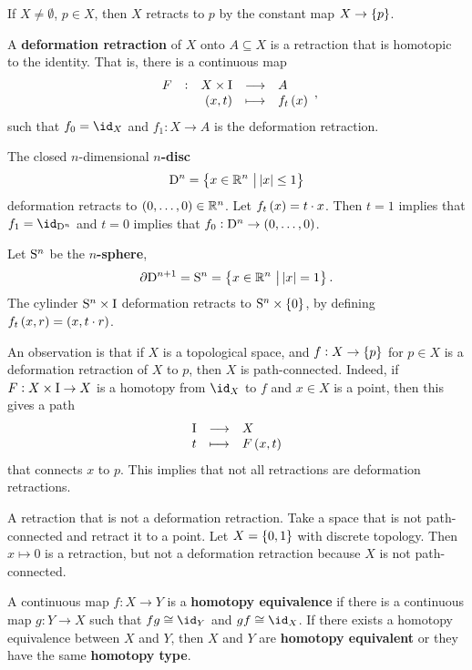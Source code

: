 \begin{example*}
If $ X \ne \emptyset $, $ p \in X $, then $ X $ retracts to $ p $ by the constant map $ X \to \cbr{p} $.
\end{example*}

\begin{definition*}
A \textbf{deformation retraction} of $ X $ onto $ A \subseteq X $ is a retraction that is homotopic to the identity. That is, there is a continuous map
$$ \function[F]{X \times \I}{A}{\br{x, t}}{f_t\br{x}}, $$
such that $ f_0 = \id_X $ and $ f_1 : X \to A $ is the deformation retraction.
\end{definition*}

\begin{example*}
The closed $ n $-dimensional \textbf{$ n $-disc}
$$ \D^n = \cbr{x \in \RR^n \st \abs{x} \le 1} $$
deformation retracts to $ \br{0, \dots, 0} \in \RR^n $. Let $ f_t\br{x} = t \cdot x $. Then $ t = 1 $ implies that $ f_1 = \id_{\D^n} $ and $ t = 0 $ implies that $ f_0 : \D^n \to \br{0, \dots, 0} $.
\end{example*}

\pagebreak

\begin{example*}
Let $ \S^n $ be the \textbf{$ n $-sphere},
$$ \da \D^{n + 1} = \S^n = \cbr{x \in \RR^n \st \abs{x} = 1}. $$
The cylinder $ \S^n \times \I $ deformation retracts to $ \S^n \times \cbr{0} $, by defining $ f_t\br{x, r} = \br{x, t \cdot r} $.
\end{example*}

An observation is that if $ X $ is a topological space, and $ f : X \to \cbr{p} $ for $ p \in X $ is a deformation retraction of $ X $ to $ p $, then $ X $ is path-connected. Indeed, if $ F : X \times \I \to X $ is a homotopy from $ \id_X $ to $ f $ and $ x \in X $ is a point, then this gives a path
$$ \function{\I}{X}{t}{F\br{x, t}} $$
that connects $ x $ to $ p $. This implies that not all retractions are deformation retractions.

\begin{example*}
A retraction that is not a deformation retraction. Take a space that is not path-connected and retract it to a point. Let $ X = \cbr{0, 1} $ with discrete topology. Then $ x \mapsto 0 $ is a retraction, but not a deformation retraction because $ X $ is not path-connected.
\end{example*}

\begin{definition*}
A continuous map $ f : X \to Y $ is a \textbf{homotopy equivalence} if there is a continuous map $ g : Y \to X $ such that $ fg \cong \id_Y $ and $ gf \cong \id_X $. If there exists a homotopy equivalence between $ X $ and $ Y $, then $ X $ and $ Y $ are \textbf{homotopy equivalent} or they have the same \textbf{homotopy type}.
\end{definition*}

